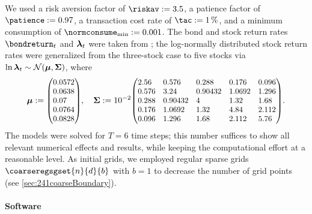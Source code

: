 We used
a risk aversion factor of $\riskav := 3.5$,
a patience factor of $\patience := 0.97$,
a transaction cost rate of $\tac := \SI{1}{\percent}$, and
a minimum consumption of $\normconsume_{\min} := 0.001$.
The bond and stock return rates $\bondreturn_t$ and ${\boldsymbol{\lambda}}_t$
were taken from \cite{Cai10Stable};
the log-normally distributed stock return rates were generalized
from the three-stock case to five stocks via
$\ln {\boldsymbol{\lambda}}_t \sim \mathcal{N}({\boldsymbol{\mu}}, {\boldsymbol{\Sigma}})$, where
{%
  \setlength{\abovedisplayskip}{6pt}%
  \setlength{\belowdisplayskip}{6pt}%
  \begin{equation}
    \label{eq:financeStockReturnMeanCovariance}
    \*\mu
    :=
    \scalebox{0.92}{$
      \begin{pmatrix*}[l]
        0.0572\\
        0.0638\\
        0.07\\
        0.0764\\
        0.0828
      \end{pmatrix*}
    $},\quad
    \mat{\Sigma}
    := 10^{-2}
    \scalebox{0.92}{$
      \begin{pmatrix*}[l]
        2.56&  0.576&   0.288&   0.176&  0.096\\
        0.576& 3.24&    0.90432& 1.0692& 1.296\\
        0.288& 0.90432& 4&       1.32&   1.68\\
        0.176& 1.0692&  1.32&    4.84&   2.112\\
        0.096& 1.296&   1.68&    2.112&  5.76
      \end{pmatrix*}
    $}.
  \end{equation}%
}%
The models were solved for $T = 6$ time steps;
this number suffices to show all relevant numerical effects and results,
while keeping the computational effort at a reasonable level.
As initial grids, we employed regular sparse grids
$\coarseregsgset{n}{d}{b}$ with $b = 1$
to decrease the number of grid points
(see \cref{sec:241coarseBoundary}).

\vspace*{0.25em}

\paragraph{Software}

